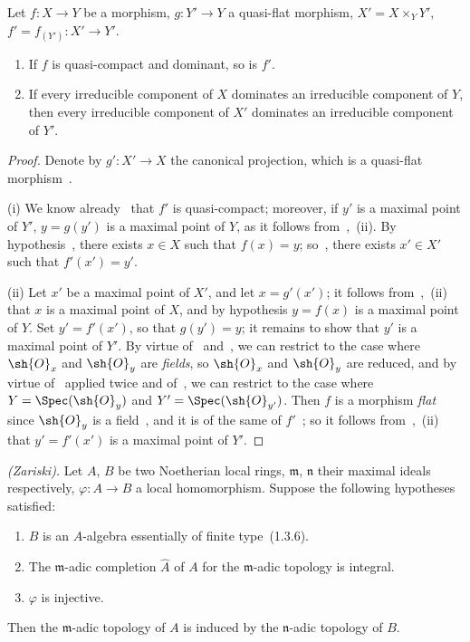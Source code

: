 \begin{proposition}[2.3.7]
\label{IV.2.3.7}
Let $f:X\to Y$ be a morphism, $g:Y'\to Y$ a quasi-flat morphism, $X'=X\times_Y Y'$, $f'=f_{(Y')}:X'\to Y'$.
\begin{enumerate}[label=(\roman*)]
  \item If $f$ is quasi-compact and dominant, so is $f'$.
  \item If every irreducible component of $X$ dominates an irreducible component of $Y$, then every irreducible component of $X'$ dominates an irreducible component of $Y'$.
\end{enumerate}
\end{proposition}

\begin{proof}
Denote by $g':X'\to X$ the canonical projection, which is a quasi-flat morphism~.

(i) We know already~ that $f'$ is quasi-compact; moreover, if $y'$ is a maximal point of $Y'$, $y=g(y')$ is a maximal point of $Y$, as it follows from~,~(ii).
By hypothesis~, there exists $x\in X$ such that $f(x)=y$; so~, there exists $x'\in X'$ such that $f'(x')=y'$.

(ii) Let $x'$ be a maximal point of $X'$, and let $x=g'(x')$; it follows from~,~(ii) that $x$ is a maximal point of $X$, and by hypothesis $y=f(x)$ is a maximal point of $Y$.
Set $y'=f'(x')$, so that $g(y')=y$; it remains to show that $y'$ is a maximal point of $Y'$.
By virtue of~ and~, we can restrict to the case where $\sh{O}_x$ and $\sh{O}_y$ are \emph{fields}, so $\sh{O}_x$ and $\sh{O}_y$ are reduced, and by virtue of~ applied twice and of~, we can restrict to the case where $Y=\Spec(\sh{O}_y)$ and $Y'=\Spec(\sh{O}_{y'})$.
Then $f$ is a morphism \emph{flat} since $\sh{O}_y$ is a field~, and it is of the same of $f'$~; so it follows from~,~(ii) that $y'=f'(x')$ is a maximal point of $Y'$.
\end{proof}

\begin{corollary}[2.3.8]
\label{IV.2.3.8}
\emph{(Zariski).}
Let $A$, $B$ be two Noetherian local rings, $\mathfrak{m}$, $\mathfrak{n}$ their maximal ideals respectively, $\varphi:A\to B$ a local homomorphism. Suppose the following hypotheses satisfied:
\begin{enumerate}
  \item[$1^\circ$] $B$ is an $A$-algebra essentially of finite type~(1.3.6).
  \item[$2^\circ$] The $\mathfrak{m}$-adic completion $\widehat{A}$ of $A$ for the $\mathfrak{m}$-adic topology is integral.
  \item[$3^\circ$] $\varphi$ is injective.
\end{enumerate}
Then the $\mathfrak{m}$-adic topology of $A$ is induced by the $\mathfrak{n}$-adic topology of $B$.
\end{corollary}

